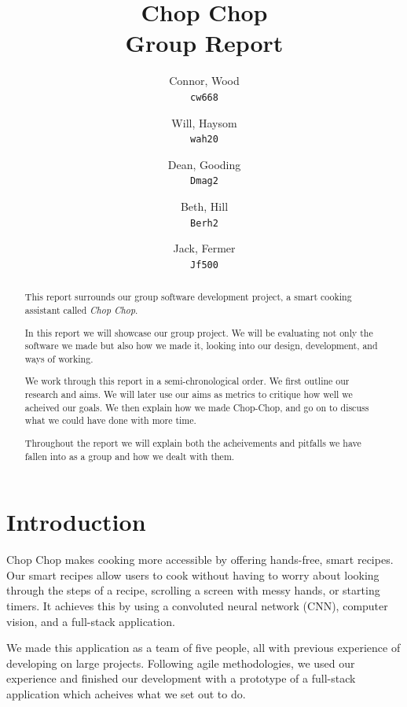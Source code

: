 \documentclass{article}
\title{%
Chop Chop \\
  \large Group Report}
\author{
  Connor, Wood\\
  \texttt{cw668}
  \and
  Will, Haysom\\
  \texttt{wah20}
  \and
  Dean, Gooding\\
  \texttt{Dmag2}
  \and
  Beth, Hill\\
  \texttt{Berh2}
  \and
  Jack, Fermer\\
  \texttt{Jf500}
}
\begin{document}
\maketitle

\pagebreak

\linenumbers

\begin{abstract}
      This report surrounds our group software development project, a smart cooking assistant called \emph{Chop Chop}. 
    
      In this report we will showcase our group project. We will be evaluating not only the software we made but also how we made it, looking into our design, development, and ways of working.

      We work through this report in a semi-chronological order. We first outline our research and aims. We will later use our aims as metrics to critique how well we acheived our goals. We then explain how we made Chop-Chop, and go on to discuss what we could have done with more time.

      Throughout the report we will explain both the acheivements and pitfalls we have fallen into as a group and how we dealt with them.
  \end{abstract}

  \pagebreak

  \tableofcontents

  \pagebreak



    \section{Introduction}
Chop Chop makes cooking more accessible by offering hands-free, smart recipes. Our smart recipes allow users to cook without having to worry about looking through the steps of a recipe, scrolling a screen with messy hands, or starting timers. It achieves this by using a convoluted neural network (CNN), computer vision, and a full-stack application.

We made this application as a team of five people, all with previous experience of developing on large projects. Following agile methodologies, we used our experience and finished our development with a prototype of a full-stack application which acheives what we set out to do. 
\end{document}
